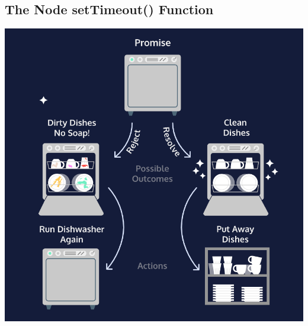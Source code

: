 \documentclass[12pt]{article}
\begin{document}
\subsection{The Node setTimeout() Function}

\begin{center}
\includegraphics[width=0.9\linewidth]{images/tutorial_3.png}
\end{center}
\end{document}
